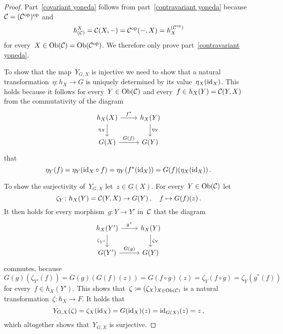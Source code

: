 \begin{proof}
  Part~\ref*{covariant yoneda} follows from part~\ref*{contravariant yoneda} because~$\mathcal{C} = (\mathcal{C}^{\mathrm{op}})^{\mathrm{op}}$ and
  \[
      h^X_{(\mathcal{C})}
    = \mathcal{C}(X,-)
    = \mathcal{C}^{\mathrm{op}}(-,X)
    = h_X^{(\mathcal{C}^{\mathrm{op}})}
  \]
  for every~$X \in \operatorname{Ob}(\mathcal{C}) = \operatorname{Ob}(\mathcal{C}^{\mathrm{op}})$.
  We therefore only prove part~\ref*{contravariant yoneda}.
  
  To show that the map~$Y_{G,X}$ is injective we need to show that a natural transformation~$\eta \colon h_X \to G$ is uniquely determined by its value~$\eta_X(\mathrm{id}_X)$.
  This holds because it follows for every~$Y \in \operatorname{Ob}(\mathcal{C})$ and every~$f \in h_X(Y) = \mathcal{C}(Y,X)$ from the commutativity of the diagram
  \[
    \begin{tikzcd}
        h_X(X)
        \arrow{r}[above]{f^*}
        \arrow{d}[left]{\eta_X}
      & h_X(Y)
        \arrow{d}[right]{\eta_Y}
      \\
        G(X)
        \arrow{r}[above]{G(f)}
      & G(Y)
    \end{tikzcd}
  \]
  that
  \[
      \eta_Y(f)
    = \eta_Y(\mathrm{id}_X \circ f)
    = \eta_Y(f^*(\mathrm{id}_X))
    = G(f)(\eta_X(\mathrm{id}_X)) \,.
  \]
  
  To show the surjectivity of~$Y_{G,X}$ let~$z \in G(X)$.
  For every~$Y \in \operatorname{Ob}(\mathcal{C})$ let
  \[
            \zeta_Y
    \colon  h_X(Y)
    =       \mathcal{C}(Y,X)
    \to     G(Y) \,,
    \quad   f
    \mapsto G(f)(z) \,.
  \]
  It then holds for every morphism~$g \colon Y \to Y'$ in~$\mathcal{C}$ that the diagram
  \[
    \begin{tikzcd}
        h_X(Y')
        \arrow{r}[above]{g^*}
        \arrow{d}[left]{\zeta_{Y'}}
      & h_X(Y)
        \arrow{d}[right]{\zeta_Y}
      \\
        G(Y')
        \arrow{r}[above]{G(g)}
      & G(Y)
    \end{tikzcd}
  \]
  commutes, because
  \[
      G(g)( \zeta_{Y'}( f ) )
    = G(g)( G(f)(z) )
    = G(f \circ g)(z)
    = \zeta_Y(f \circ g)
    = \zeta_Y( g^*(f) )
  \]
  for every~$f \in h_X(Y')$.
  This shows that~$\zeta \coloneqq (\zeta_X)_{X \in \operatorname{Ob}(\mathcal{C})}$ is a natural transformation~$\zeta \colon h_X \to F$.
  It holds that
  \[
      Y_{G,X}(\zeta)
    = \zeta_X(\mathrm{id}_X)
    = G(\mathrm{id}_X)(z)
    = \mathrm{id}_{G(X)}(z)
    = z \,,
  \]
  which altogether shows that~$Y_{G,X}$ is surjective.
\end{proof}









